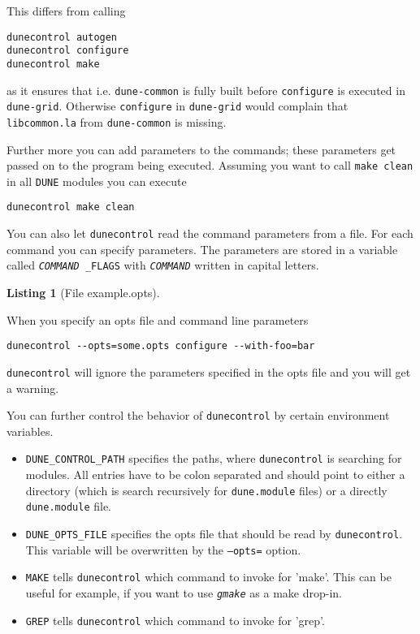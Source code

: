 \documentclass[11pt,a4paper,headinclude,footinclude,DIV16,normalheadings]{scrartcl}
\newtheorem{lst}{Listing}
\newcommand{\dune}{\texttt{DUNE}\xspace}
\newcommand{\configure}{\texttt{configure}\xspace}
\newcommand{\dunecommon}{\texttt{dune-common}\xspace}
\newcommand{\dunegrid}{\texttt{dune-grid}\xspace}
\newcommand{\dunecontrol}{\texttt{dunecontrol}\xspace}
\begin{document}
This differs from calling
\begin{lstlisting}
dunecontrol autogen
dunecontrol configure
dunecontrol make
\end{lstlisting}
as it ensures that i.e. \dunecommon is fully built before \configure
is executed in \dunegrid. Otherwise \configure in \dunegrid would
complain that \texttt{libcommon.la} from \dunecommon is missing.

Further more you can add parameters to the commands; these parameters
get passed on to the program being executed. Assuming you want to call
\texttt{make clean} in all \dune modules you can execute
\begin{lstlisting}
dunecontrol make clean
\end{lstlisting}

You can also let \dunecontrol read the command parameters from a file.
For each command you can specify parameters. The parameters are stored
in a variable called \texttt{\textit{COMMAND}\,\_FLAGS} with
\texttt{\textit{COMMAND}} written in capital letters.

\begin{lst}[File example.opts] \mbox{}

\end{lst}

When you specify an opts file and command line parameters
\begin{lstlisting}
dunecontrol --opts=some.opts configure --with-foo=bar
\end{lstlisting}
\dunecontrol will ignore the parameters specified in the opts file and
you will get a warning.

You can further control the behavior of \dunecontrol by certain
environment variables.
\begin{itemize}
\item \texttt{DUNE\_CONTROL\_PATH} specifies the paths, where
  \dunecontrol is searching for modules. All entries have to be colon
  separated and should point to either a directory (which is search
  recursively for \texttt{dune.module} files) or a directly
  \texttt{dune.module} file.
\item \texttt{DUNE\_OPTS\_FILE} specifies the opts file that should be
  read by \dunecontrol. This variable will be overwritten by the
  \texttt{--opts=} option.
\item \texttt{MAKE} tells \dunecontrol which command to invoke for
  'make'. This can be useful for example, if you want to use
  \texttt{\textit{gmake}} as a make drop-in.
\item \texttt{GREP} tells \dunecontrol which command to invoke for 'grep'.
\end{itemize}
\end{document}
